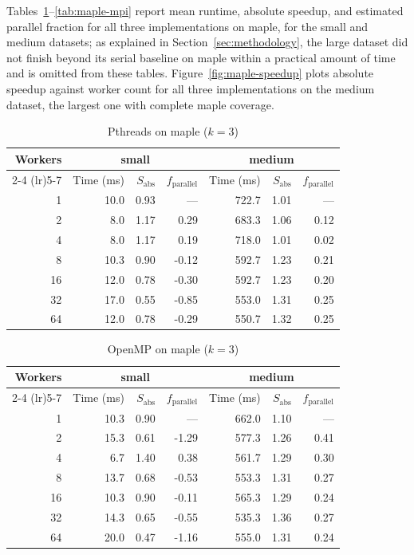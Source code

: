 \documentclass[conference]{IEEEtran}
\begin{document}
Tables~\ref{tab:maple-threaded}--\ref{tab:maple-mpi} report mean runtime,
absolute speedup, and estimated parallel fraction for all three
implementations on maple, for the small and medium datasets; as explained
in Section~\ref{sec:methodology}, the large dataset did not finish beyond
its serial baseline on maple within a practical amount of time and is
omitted from these tables. Figure~\ref{fig:maple-speedup} plots absolute
speedup against worker count for all three implementations on the medium
dataset, the largest one with complete maple coverage.

\begin{table}[t]
\caption{Pthreads on maple ($k=3$)}
\label{tab:maple-threaded}
\centering
\begin{tabular}{rrrrrrr}
\toprule
Workers & \multicolumn{3}{c}{small} & \multicolumn{3}{c}{medium} \\
\cmidrule(lr){2-4} \cmidrule(lr){5-7}
 & Time (ms) & $S_{\text{abs}}$ & $f_{\text{parallel}}$ & Time (ms) & $S_{\text{abs}}$ & $f_{\text{parallel}}$ \\
\midrule
1 & 10.0 & 0.93 & --- & 722.7 & 1.01 & --- \\
2 & 8.0 & 1.17 & 0.29 & 683.3 & 1.06 & 0.12 \\
4 & 8.0 & 1.17 & 0.19 & 718.0 & 1.01 & 0.02 \\
8 & 10.3 & 0.90 & -0.12 & 592.7 & 1.23 & 0.21 \\
16 & 12.0 & 0.78 & -0.30 & 592.7 & 1.23 & 0.20 \\
32 & 17.0 & 0.55 & -0.85 & 553.0 & 1.31 & 0.25 \\
64 & 12.0 & 0.78 & -0.29 & 550.7 & 1.32 & 0.25 \\
\bottomrule
\end{tabular}
\end{table}

\begin{table}[t]
\caption{OpenMP on maple ($k=3$)}
\label{tab:maple-openmp}
\centering
\begin{tabular}{rrrrrrr}
\toprule
Workers & \multicolumn{3}{c}{small} & \multicolumn{3}{c}{medium} \\
\cmidrule(lr){2-4} \cmidrule(lr){5-7}
 & Time (ms) & $S_{\text{abs}}$ & $f_{\text{parallel}}$ & Time (ms) & $S_{\text{abs}}$ & $f_{\text{parallel}}$ \\
\midrule
1 & 10.3 & 0.90 & --- & 662.0 & 1.10 & --- \\
2 & 15.3 & 0.61 & -1.29 & 577.3 & 1.26 & 0.41 \\
4 & 6.7 & 1.40 & 0.38 & 561.7 & 1.29 & 0.30 \\
8 & 13.7 & 0.68 & -0.53 & 553.3 & 1.31 & 0.27 \\
16 & 10.3 & 0.90 & -0.11 & 565.3 & 1.29 & 0.24 \\
32 & 14.3 & 0.65 & -0.55 & 535.3 & 1.36 & 0.27 \\
64 & 20.0 & 0.47 & -1.16 & 555.0 & 1.31 & 0.24 \\
\bottomrule
\end{tabular}
\end{table}
\end{document}
